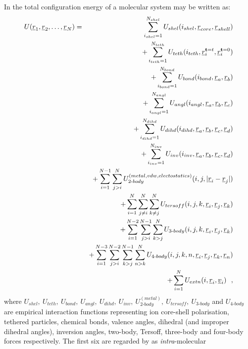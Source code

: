 In \D the total configuration energy of a molecular system may
be written as:
\begin{eqnarray}
U(\mbox{$\underline{r}$}_{1},\mbox{$\underline{r}$}_{2},\ldots,\mbox{$\underline{r}$}_{N})&=&
      \sum_{i_{shel}=1}^{N_{shel}} U_{shel}(i_{shel},\mbox{$\underline{r}$}_{core},\mbox{$\underline{r}$}_{shell}) \nonumber \\
& & + \sum_{i_{teth}=1}^{N_{teth}} U_{teth}(i_{teth},\mbox{$\underline{r}$}_{i}^{{\bf t}=t},\mbox{$\underline{r}$}_{i}^{{\bf t}=0}) \nonumber \\
& & + \sum_{i_{bond}=1}^{N_{bond}} U_{bond}(i_{bond},\mbox{$\underline{r}$}_{a},\mbox{$\underline{r}$}_{b}) \nonumber \\
& & + \sum_{i_{angl}=1}^{N_{angl}} U_{angl}(i_{angl},\mbox{$\underline{r}$}_{a},\mbox{$\underline{r}$}_{b},\mbox{$\underline{r}$}_{c}) \nonumber \\
& & + \sum_{i_{dihd}=1}^{N_{dihd}} U_{dihd}(i_{dihd},\mbox{$\underline{r}$}_{a},\mbox{$\underline{r}$}_{b},\mbox{$\underline{r}$}_{c},\mbox{$\underline{r}$}_{d}) \nonumber \\
& & + \sum_{i_{inv}=1}^{N_{inv}} U_{inv}(i_{inv},\mbox{$\underline{r}$}_{a},\mbox{$\underline{r}$}_{b},\mbox{$\underline{r}$}_{c},\mbox{$\underline{r}$}_{d}) \nonumber \\
& & + \sum_{i=1}^{N-1}\sum_{j>i}^{N} U_{2\textrm{-}body}^{(metal,vdw,electostatics)}(i,j,|\mbox{$\underline{r}$}_{i}-\mbox{$\underline{r}$}_{j}|) \\
& & + \sum_{i=1}^{N}\sum_{j{\ne}i}^{N}\sum_{k{\ne}j}^{N} U_{tersoff}(i,j,k,\mbox{$\underline{r}$}_{i},\mbox{$\underline{r}$}_{j},\mbox{$\underline{r}$}_{k}) \nonumber \\
& & + \sum_{i=1}^{N-2}\sum_{j>i}^{N-1}\sum_{k>j}^{N} U_{3\textrm{-}body}(i,j,k,\mbox{$\underline{r}$}_{i},\mbox{$\underline{r}$}_{j},\mbox{$\underline{r}$}_{k}) \nonumber \\
& & + \sum_{i=1}^{N-3}\sum_{j>i}^{N-2}\sum_{k>j}^{N-1}\sum_{n>k}^{N} U_{4\textrm{-}body}(i,j,k,n,\mbox{$\underline{r}$}_{i},\mbox{$\underline{r}$}_{j},\mbox{$\underline{r}$}_{k},\mbox{$\underline{r}$}_{n}) \nonumber \\
& & + \sum_{i=1}^{N}U_{extn}(i,\mbox{$\underline{r}$}_{i},\mbox{$\underline{v}$}_{i})~~,\nonumber
\end{eqnarray}
where
$U_{shel},~U_{teth},~U_{bond},~U_{angl},~U_{dihd},~U_{inv},~U^{(metal)}_{2\textrm{-}body},
~U_{tersoff},~U_{3\textrm{-}body}$ and $U_{4\textrm{-}body}$ are empirical interaction
functions representing
ion core-shell polarisation,
tethered particles,
chemical bonds,
valence angles,
dihedral
(and improper dihedral angles),
inversion angles,
two-body,
Tersoff,
three-body and
four-body forces respectively.  The
first six are regarded by \D as {\em intra}-molecular
